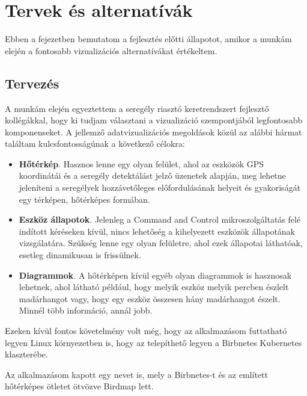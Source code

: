 \chapter{Tervek és alternatívák}
\label{chapt:birdmap-introduction}
Ebben a fejezetben bemutatom a fejlesztés előtti állapotot, amikor a munkám elején a fontosabb vizualizációs alternatívákat értékeltem.

\section{Tervezés}
A munkám elején egyeztettem a seregély riasztó keretrendszert fejlesztő kollégákkal, 
hogy ki tudjam választani a vizualizáció szempontjából legfontosabb komponenseket.
A jellemző adatvizualizációs megoldások közül az alábbi hármat találtam kulcsfontosságúnak a következő célokra:
\begin{itemize}
    \item \textbf{Hőtérkép}. Hasznos lenne egy olyan felület, ahol az eszközök GPS koordinátái és a seregély detektálást jelző üzenetek alapján, meg lehetne jeleníteni a seregélyek hozzávetőleges előfordulásának helyeit és gyakoriságát egy térképen, hőtérképes formában.
    \item \textbf{Eszköz állapotok}. Jelenleg a Command and Control mikroszolgáltatás felé indított kéréseken kívül, nincs lehetőség a kihelyezett eszközök állapotának vizsgálatára. Szükség lenne egy olyan felületre, ahol ezek állapotai láthatóak, esetleg dinamikusan is frissülnek.
    \item \textbf{Diagrammok}. A hőtérképen kívül egyéb olyan diagrammok is hasznosak lehetnek, ahol látható például, hogy melyik eszköz melyik percben észlelt madárhangot vagy, hogy egy eszköz összesen hány madárhangot észelt. Minnél több információ, annál jobb.
\end{itemize}
Ezeken kívül fontos követelmény volt még, hogy az alkalmazásom futtatható legyen Linux környezetben is, hogy az telepíthető legyen a Birbnetes Kubernetes \cite{kubernetes} klaszterébe.

Az alkalmazásom kapott egy nevet is, mely a Birbnetes-t és az említett hőtérképes ötletet ötvözve Birdmap lett.
